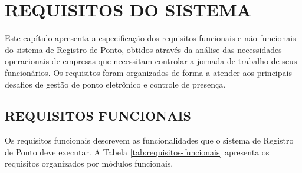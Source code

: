 \chapter{REQUISITOS DO SISTEMA}

Este capítulo apresenta a especificação dos requisitos funcionais e não funcionais do sistema de Registro de Ponto, obtidos através da análise das necessidades operacionais de empresas que necessitam controlar a jornada de trabalho de seus funcionários. Os requisitos foram organizados de forma a atender aos principais desafios de gestão de ponto eletrônico e controle de presença.

\section{REQUISITOS FUNCIONAIS}

Os requisitos funcionais descrevem as funcionalidades que o sistema de Registro de Ponto deve executar. A Tabela \ref{tab:requisitos-funcionais} apresenta os requisitos organizados por módulos funcionais.

